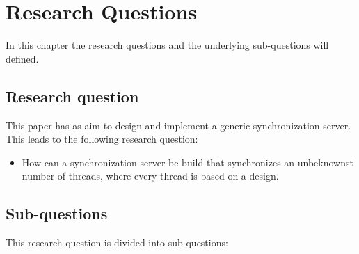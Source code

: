 \hypertarget{research-questions}{%
\chapter{Research Questions}\label{research-questions}}

In this chapter the research questions and the underlying sub-questions
will defined.

\hypertarget{research-question}{%
\section{Research question}\label{research-question}}

This paper has as aim to design and implement a generic synchronization
server. This leads to the following research question:

\begin{itemize}
\tightlist
\item
  How can a synchronization server be build that synchronizes an
  unbeknownst number of threads, where every thread is based on a
  design.
\end{itemize}

\hypertarget{sub-questions}{%
\section{Sub-questions}\label{sub-questions}}

This research question is divided into sub-questions:

